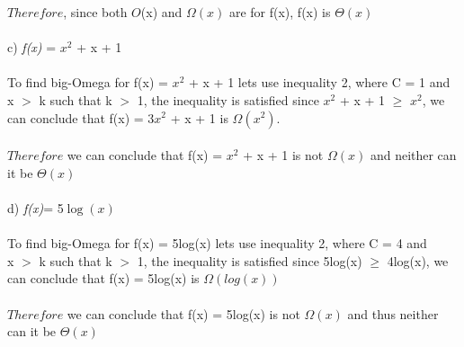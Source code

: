 \documentclass{article}
\begin{document}
$Therefore$, since both $O$(x) and $\Omega{(x)}$ are for f(x), f(x) is $\Theta{(x)}$ \\\\
c) \textit{f(x)} = $x^2$ + x + 1 \\  \\ 
To find big-Omega for f(x) = $x^2$ + x + 1 lets use inequality 2, where C = 1 and x $>$ k such that k $>$ 1, the inequality is  satisfied since $x^2$ + x + 1 $\geq$ $x^2$, we can conclude that f(x) = 3$x^2$ + x + 1 is $\Omega(x^2)$. \\\\ 
$Therefore$ we can conclude that f(x) = $x^2$ + x + 1 is not $\Omega(x)$ and neither can it be $\Theta(x)$ \\ \\ 
d) \textit{f(x)}= 5$\log(x)$ \\ \\ 
To find big-Omega for f(x) = 5log(x)  lets use inequality 2, where C = 4 and \\ x $>$ k such that k $>$ 1, the inequality is satisfied since 5log(x) $\geq$ 4log(x), we can conclude that f(x) =  5log(x) is $\Omega(log(x))$ \\\\
$Therefore$ we can conclude that f(x) = 5log(x) is not $\Omega(x)$ and thus neither can it be $\Theta(x)$ \\ \\ 
\newpage
\end{document}
